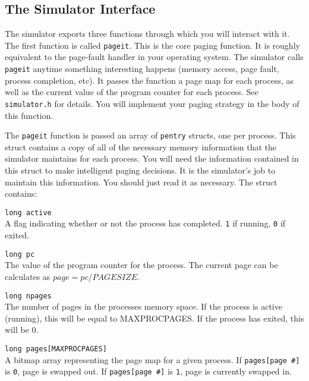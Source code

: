 \documentclass[12pt]{article}
\newenvironment{packed_desc}{
\begin{description}
  \setlength{\itemsep}{1pt}
  \setlength{\parskip}{0pt}
  \setlength{\parsep}{0pt}
}{\end{description}}
\begin{document}
\subsection {The Simulator Interface}

The simulator exports three functions through which you will interact
with it. The first function is called \texttt{pageit}. This is the
core paging function. It is roughly equivalent to the page-fault handler in
your operating system. The simulator calls \texttt{pageit} anytime
something interesting happens (memory access, page fault, process
completion, etc). It passes the function a page map for each process,
as well as the current value of the program counter for each
process. See \texttt{simulator.h} for details. You will
implement your paging strategy in the body of this function.

The \texttt{pageit} function is passed an array of \texttt{pentry}
structs, one per process. This struct contains a copy of all of the
necessary memory information that the simulator maintains for each
process. You will need the information contained in this struct to make
intelligent paging decisions. It is the simulator's job to maintain
this information. You should just read it as necessary. The struct
contains:

\begin{packed_desc}
\item[\texttt{long active}] \hfill \\
  A flag indicating whether or not the
  process has completed. \texttt{1} if running, \texttt{0} if exited.
\item[\texttt{long pc}] \hfill \\
  The value of the program counter for the
  process. The current page can be calculates as $page = pc / PAGESIZE$.
\item[\texttt{long npages}] \hfill \\
  The number of pages in the processes
  memory space. If the process is active (running), this will be equal
  to MAXPROCPAGES. If the process has exited, this will be 0.
\item[\texttt{long pages[MAXPROCPAGES]}] \hfill \\
  A bitmap array representing the
  page map for a given process. If \texttt{pages[page \#]} is
  \texttt{0}, page
  is swapped out. If \texttt{pages[page \#]} is \texttt{1},
  page is currently swapped in.
\end{packed_desc}
\end{document}
